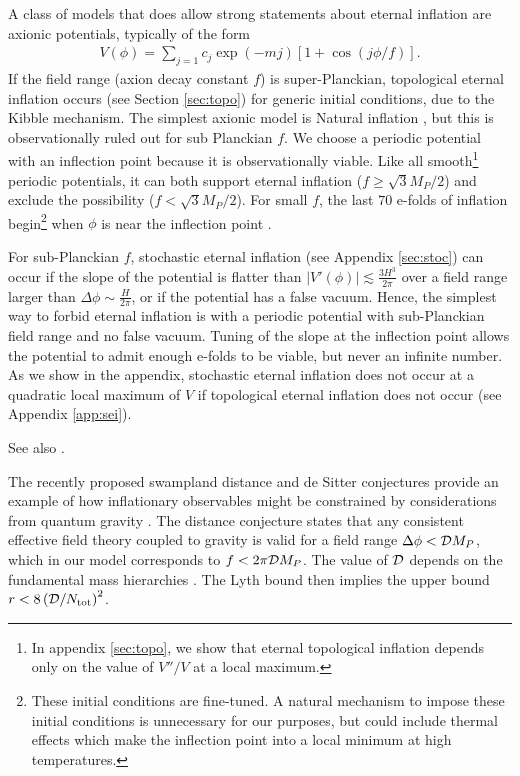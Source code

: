 \documentclass[aps,amsfonts,amsmath,prd,preprint,nofootinbib,superscriptaddress]{revtex4}
\newcommand{\Mp}{{M_{P}}}
\begin{document}
A class of models that does allow strong statements about eternal inflation are axionic potentials, typically of the form \cite{shiu}
\begin{align}
V(\phi) = \sum_{j=1} c_j \exp(- m j)\left[1 + \cos(j\phi/f)\right].
\end{align}
If the field range (axion decay constant $f$) is super-Planckian, topological 
eternal inflation \cite{Vilenkin:1994pv,Linde:1994wt} occurs (see Section \ref{sec:topo}) for generic initial conditions, due to the Kibble mechanism.  
The simplest axionic model is Natural inflation \cite{freese}, but this is observationally ruled out for sub Planckian $f$.
We choose a periodic potential with an inflection point  because it is observationally viable.  
Like all smooth\footnote{In appendix \ref{sec:topo}, we show that eternal topological inflation depends only on the value of $V''/V$ at a local maximum.} periodic potentials, it can both support eternal inflation ($f \geq \sqrt{3}\Mp/2$) and exclude the possibility ($f < \sqrt{3}\Mp/2$).  
For small $f$, the last $70$ e-folds of inflation begin\footnote{
	These initial conditions are fine-tuned.  A natural mechanism to impose these initial conditions is unnecessary for our purposes, but could 
	include thermal effects which make the inflection point into a local minimum at high temperatures.}
when $\phi$ is near the inflection point \cite{Martin:2013tda, Allahverdi:2008bt, Hotchkiss:2011am,Musoke:2017frr}.



For sub-Planckian $f$, stochastic 
eternal inflation (see Appendix \ref{sec:stoc}) can occur if 
the slope of the potential is flatter than $\left|V'(\phi)\right| \lesssim \frac{3H^3}{2\pi}$ over a field range larger 
than $\Delta\phi \sim \frac{H}{2\pi}$, or if the potential has a false vacuum.
Hence, the simplest way to forbid eternal inflation is with a periodic potential
with sub-Planckian field range and no false vacuum.  Tuning of the slope at the inflection point allows the potential to admit 
enough e-folds to be viable, but never an infinite number.  As we show in the appendix, stochastic eternal inflation does not occur at a quadratic
local maximum of $V$ if topological eternal inflation does not occur (see Appendix \ref{app:sei}).




See also \cite{Guth:1985ya}.


The recently proposed swampland distance and de Sitter conjectures provide an example of how inflationary observables might be 
constrained by considerations from quantum gravity \cite{Brown:2015iha}.  The distance conjecture
states that any consistent effective field theory coupled to gravity is valid for a field range $\Delta\phi < {\cal D}\Mp$, which in our 
model corresponds to $f < 2\pi {\cal D}\Mp$.  The value of ${\cal D}$ depends on
the fundamental mass hierarchies \cite{Dias:2018ngv}.  The Lyth bound \cite{} then implies the upper bound $r < 8\left({\cal D}/N_{\rm tot}\right)^2$.
\end{document}
